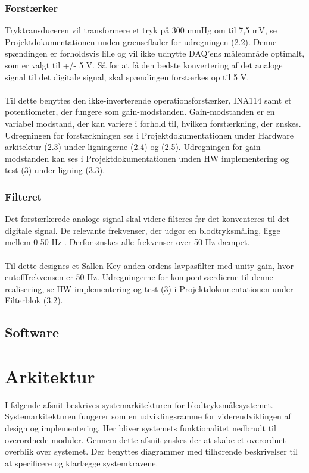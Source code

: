 \subsubsection{Forstærker}
Tryktransduceren vil transformere et tryk på 300 mmHg om til 7,5 mV, se Projektdokumentationen unden grænseflader for udregningen (2.2). Denne spændingen er forholdsvis lille og vil ikke udnytte DAQ'ens måleområde optimalt, som er valgt til +/- 5 V. Så for at få den bedste konvertering af det analoge signal til det digitale signal, skal spændingen forstærkes op til 5 V. 
\\\\
Til dette benyttes den ikke-inverterende operationsforstærker, INA114 samt et potentiometer, der fungere som gain-modstanden. Gain-modstanden er en variabel modstand, der kan variere i forhold til, hvilken forstærkning, der ønskes. Udregningen for forstærkningen ses i Projektdokumentationen under Hardware arkitektur (2.3) under ligningerne (2.4) og (2.5). Udregningen for gain-modstanden kan ses i Projektdokumentationen unden HW implementering og test (3) under ligning (3.3).     

\subsubsection{Filteret}
Det forstærkerede analoge signal skal videre filteres før det konventeres til det digitale signal. De relevante frekvenser, der udgør en blodtryksmåling, ligge mellem 0-50 Hz \cite[s. 10]{Billed for invasiv blodtryksmaling} . Derfor ønskes alle frekvenser over 50 Hz dæmpet.
\\\\
Til dette designes et Sallen Key anden ordens lavpasfilter med unity gain, hvor cutofffrekvensen er 50 Hz. Udregningerne for kompontværdierne til denne realisering, se HW implementering og test (3) i Projektdokumentationen under Filterblok (3.2).

\subsection{Software} 




        

\section{Arkitektur}
I følgende afsnit beskrives systemarkitekturen for blodtryksmålesystemet. Systemarkitekturen fungerer som en udviklingsramme for videreudviklingen af design og implementering. Her bliver systemets funktionalitet nedbrudt til overordnede moduler. Gennem dette afsnit ønskes der at skabe et overordnet overblik over systemet. Der benyttes diagrammer med tilhørende beskrivelser til at specificere og klarlægge systemkravene.

